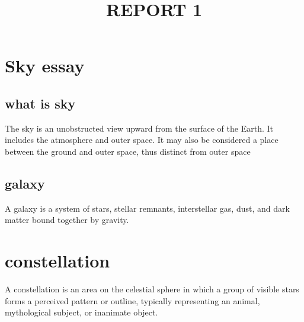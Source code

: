 \documentclass{report}
\title{REPORT 1}
\author{}
\date{}
\begin{document}
\maketitle
\tableofcontents
\chapter{Sky essay}
\section{what is sky}
The sky is an unobstructed view upward from the surface of the Earth. It includes the atmosphere and outer space. It may also be considered a place between the ground and outer space, thus distinct from outer space
\section{galaxy}
A galaxy is a system of stars, stellar remnants, interstellar gas, dust, and dark matter bound together by gravity.
\chapter{constellation}
A constellation is an area on the celestial sphere in which a group of visible stars forms a perceived pattern or outline, typically representing an animal, mythological subject, or inanimate object.
\end{document}
